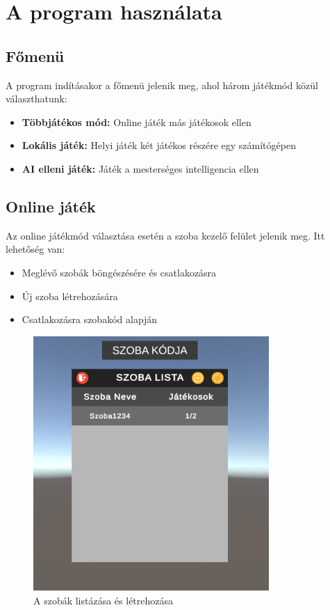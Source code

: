 \section{A program használata}

\subsection{Főmenü}
A program indításakor a főmenü jelenik meg, ahol három játékmód közül választhatunk:

\begin{itemize}
	\item \textbf{Többjátékos mód:} Online játék más játékosok ellen
	\item \textbf{Lokális játék:} Helyi játék két játékos részére egy számítógépen
	\item \textbf{AI elleni játék:} Játék a mesterséges intelligencia ellen
\end{itemize}

\subsection{Online játék}
Az online játékmód választása esetén a szoba kezelő felület jelenik meg. Itt lehetőség van:

\begin{itemize}
	\item Meglévő szobák böngészésére és csatlakozásra
	\item Új szoba létrehozására
	\item Csatlakozásra szobakód alapján
\end{itemize}

\begin{figure}[h]
	\centering
	\includegraphics[width=0.8\textwidth]{lobbylist}
	\caption{A szobák listázása és létrehozása}
	\label{fig:lobby-list}
\end{figure}

